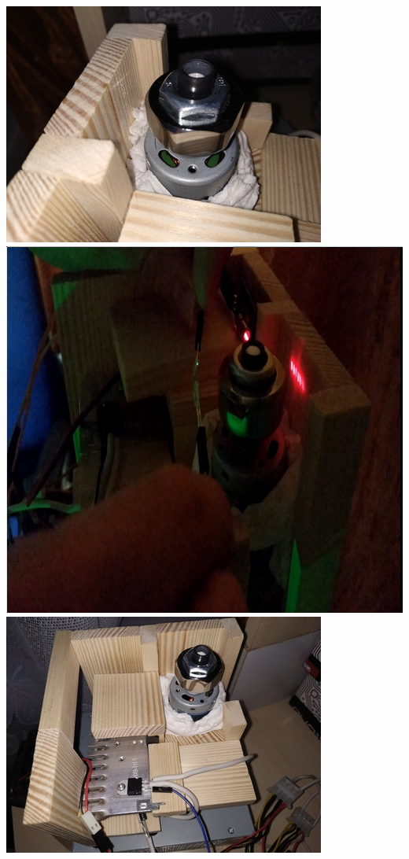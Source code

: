 \documentclass[a4paper,oneside,11pt]{report}
\begin{document}
\begin{enumerate}[1.]
\includegraphics[scale=0.5]{images/20.jpg} 
\includegraphics[scale=0.3]{images/21.png} 
\includegraphics[scale=0.5]{images/22.jpg} 

\end{enumerate}
\end{document}
